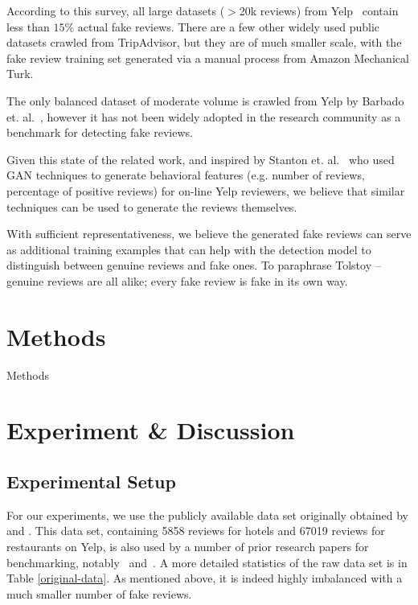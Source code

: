 \documentclass[conference]{IEEEtran} %
\theoremstyle{plain}
\theoremstyle{definition}
\begin{document}
According to this survey, all large datasets ($>$20k reviews) from Yelp~\cite{rayana2015collective} contain less than $15\%$ actual fake reviews. There are a few other widely used public datasets crawled from TripAdvisor, but they are of much smaller scale, with the fake review training set generated via a manual process from Amazon Mechanical Turk.

The only balanced dataset of moderate volume is crawled from Yelp by Barbado et. al.~\cite{barbado2019framework}, however it has not been widely adopted in the research community as a benchmark for detecting fake reviews.

Given this state of the related work, and inspired by Stanton et. al.~\cite{stanton2019gans} who used GAN techniques to generate behavioral features (e.g. number of reviews, percentage of positive reviews) for on-line Yelp reviewers, we believe that similar techniques can be used to generate the reviews themselves.

With sufficient representativeness, we believe the generated fake reviews can serve as additional training examples that can help with the detection model to distinguish between genuine reviews and fake ones. To paraphrase Tolstoy --  genuine reviews are all alike; every fake review is fake in its own way.



\section{Methods}
\label{methods}

Methods

\section{Experiment \& Discussion}
\label{exp}

\subsection{Experimental Setup}
For our experiments, we use the publicly available data set originally obtained by \cite{mukherjee2013fake} and \cite{mukherjee2013yelp}.
This data set, containing 5858 reviews for hotels and 67019 reviews for restaurants on Yelp, is also used by a number of prior research papers for benchmarking, notably~\cite{wang2017handling} and~\cite{Tang2020}.
 A more detailed statistics of the raw data set is in Table \ref{original-data}. As mentioned above, it is indeed highly imbalanced with a much smaller number of fake reviews.
\end{document}
